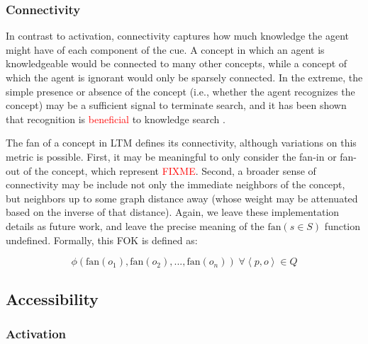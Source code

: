 \documentclass[10pt,letterpaper]{article}
\newcommand{\comment}[1]{}
\newcommand{\fixme}[2][]{#2}
\renewcommand{\fixme}[2][]{\textcolor{red}{#2}}
\newcommand{\tuple}[1]{\left \langle #1 \right \rangle }
\begin{document}
\subsubsection{Connectivity}

In contrast to activation, connectivity captures how much knowledge the agent might have of each component of the cue.
A concept in which an agent is knowledgeable would be connected to many other concepts, while a concept of which the agent is ignorant would only be sparsely connected.
In the extreme, the simple presence or absence of the concept (i.e., whether the agent recognizes the concept) may be a sufficient signal to terminate search, and it has been shown that recognition is \fixme{beneficial} to knowledge search \cite{Li2012FunctionalInteractionsBetween}.

The fan of a concept in LTM defines its connectivity, although variations on this metric is possible.
First, it may be meaningful to only consider the fan-in or fan-out of the concept, which represent \fixme{FIXME}.
Second, a broader sense of connectivity may be include not only the immediate neighbors of the concept, but neighbors up to some graph distance away (whose weight may be attenuated based on the inverse of that distance).
Again, we leave these implementation details as future work, and leave the precise meaning of the $\text{fan}(s{\in}S)$ function undefined.
Formally, this FOK is defined as:

$$\phi\left(\text{fan}(o_1), \text{fan}(o_2), ..., \text{fan}(o_n)\right) \; \forall {\tuple{p, o}{\in}Q}$$

\fixme[Are there other cue-related sources worth mentioning, eg. recognition?]{}

\subsection{Accessibility}

\comment{
    unlike cur familiarity, only available during and after retrieval
        "byproducts" of the retrieval process \cite{Koriat1993HowDoWe}
    more generally, we consider any attributes of the result of a query
}

\subsubsection{Activation}
\end{document}
